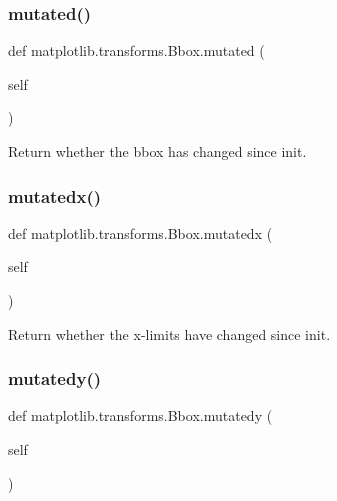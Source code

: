 \subsubsection{\texorpdfstring{mutated()}{mutated()}}
{\footnotesize\ttfamily def matplotlib.\+transforms.\+Bbox.\+mutated (\begin{DoxyParamCaption}\item[{}]{self }\end{DoxyParamCaption})}

\begin{DoxyVerb}Return whether the bbox has changed since init.\end{DoxyVerb}
 \mbox{\label{classmatplotlib_1_1transforms_1_1Bbox_aad0bdee7a22bcf6cd7beb7e85803b433}} 
\subsubsection{\texorpdfstring{mutatedx()}{mutatedx()}}
{\footnotesize\ttfamily def matplotlib.\+transforms.\+Bbox.\+mutatedx (\begin{DoxyParamCaption}\item[{}]{self }\end{DoxyParamCaption})}

\begin{DoxyVerb}Return whether the x-limits have changed since init.\end{DoxyVerb}
 \mbox{\label{classmatplotlib_1_1transforms_1_1Bbox_a1669c464c8f6b1d5448ff62d35141f71}} 
\subsubsection{\texorpdfstring{mutatedy()}{mutatedy()}}
{\footnotesize\ttfamily def matplotlib.\+transforms.\+Bbox.\+mutatedy (\begin{DoxyParamCaption}\item[{}]{self }\end{DoxyParamCaption})}


